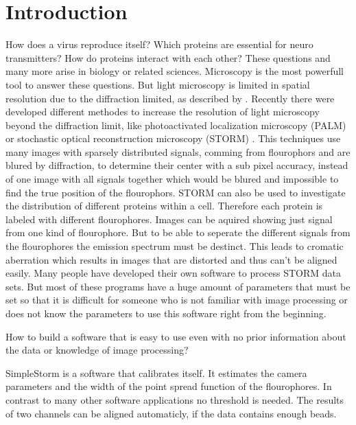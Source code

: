 \chapter{Introduction}
How does a virus reproduce itself? Which proteins are essential for neuro transmitters? How do proteins interact with each other? These questions and many more arise in biology or related sciences. Microscopy is the most powerfull tool to answer these questions. But light microscopy is limited in spatial resolution due to the diffraction limited, as described by \cite{Abbe}. Recently there were developed different methodes to increase the resolution of light microscopy beyond the diffraction limit, like photoactivated localization microscopy (PALM) \cite{Palm} or stochastic optical reconstruction microscopy (STORM) \cite{Storm}. This techniques use many images with sparsely distributed signals, comming from flourophors and are blured by diffraction, to determine their center with a sub pixel accuracy, instead of one image with all signals together which would be blured and impossible to find the true position of the flourophors.
\newline
STORM can also be used to investigate the distribution of different proteins within a cell. Therefore each protein is labeled with different flourophores. Images can be aquired showing just signal from one kind of flourophore. But to be able to seperate the different signals from the flourophores the emission spectrum must be destinct. This leads to cromatic aberration which results in images that are distorted and thus can't be aligned easily. 
Many people have developed their own software to process STORM data sets. But most of these programs have a huge amount of parameters that must be set so that it is difficult for someone who is not familiar with image processing or does not know the parameters to use this software right from the beginning.\newline

How to build a software that is easy to use even with no prior information about the data or knowledge of image processing? \newline

SimpleStorm is a software that calibrates itself. It estimates the camera parameters and the width of the point spread function of the flourophores. In contrast to many other software applications no threshold is needed.\newline
The results of two channels can be aligned automaticly, if the data contains enough beads.

